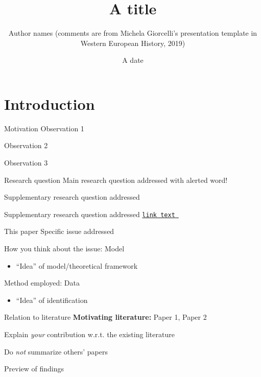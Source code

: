\documentclass[aspectratio=169, 11pt]{beamer}
\title[Some title]{A title}
\author{Author names (comments are from Michela Giorcelli's presentation template in Western European History, 2019)}
\date{A date}
\begin{document}
\maketitle

{%
\section{Introduction}}

\begin{frame}{Motivation}
    Observation 1
    
    Observation 2
    
    Observation 3
\end{frame}

\begin{frame}{Research question}
    Main research question addressed with \alert{alerted} word!\pause
    
    Supplementary research question addressed\pause
    
    Supplementary research question addressed \hyperlink{app_example}{\texttt{link text}~ }
\end{frame}

\begin{frame}{This paper}
    Specific issue addressed
    
    How you think about the issue: Model
    \begin{itemize}
        \item ``Idea'' of model/theoretical framework
    \end{itemize}
    
    Method employed: Data
    \begin{itemize}
        \item ``Idea'' of identification
    \end{itemize}
\end{frame}

\begin{frame}{Relation to literature}
    \textbf{Motivating literature:} Paper 1, Paper 2
    
    Explain \emph{your} contribution w.r.t. the existing literature
    
    Do \emph{not} summarize others' papers
\end{frame}

\begin{frame}{Preview of findings}
    
\end{frame}
\end{document}

